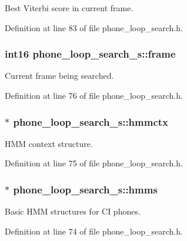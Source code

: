 Best Viterbi score in current frame. 



Definition at line 83 of file phone\-\_\-loop\-\_\-search.\-h.

\subsubsection[{frame}]{\setlength{\rightskip}{0pt plus 5cm}int16 phone\-\_\-loop\-\_\-search\-\_\-s\-::frame}\label{structphone__loop__search__s_a160e5fb9670d1870e5b21379a87bace5}


Current frame being searched. 



Definition at line 76 of file phone\-\_\-loop\-\_\-search.\-h.

\subsubsection[{hmmctx}]{$\ast$ phone\-\_\-loop\-\_\-search\-\_\-s\-::hmmctx}\label{structphone__loop__search__s_a67c44a95de79cb421fbeed4432686f48}


H\-M\-M context structure. 



Definition at line 75 of file phone\-\_\-loop\-\_\-search.\-h.

\subsubsection[{hmms}]{$\ast$ phone\-\_\-loop\-\_\-search\-\_\-s\-::hmms}\label{structphone__loop__search__s_a6f29f6a259a1ee07108bb55036cec9d0}


Basic H\-M\-M structures for C\-I phones. 



Definition at line 74 of file phone\-\_\-loop\-\_\-search.\-h.

